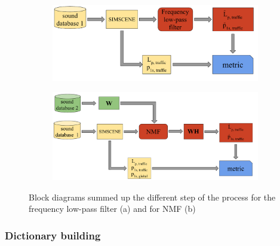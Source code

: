 \documentclass[twocolumn,a4paper,10pt]{article}
\begin{document}
\begin{figure}

    \centering
    \begin{subfigure}[t]{0.45\textwidth}
        \centering
        \includegraphics[width=\linewidth]{figures/bloc_diagram_filtrage_EN.pdf}
  		\caption{}
  		\label{fig:bloc_filtre}
    \end{subfigure}%
    \vfill
    \begin{subfigure}[t]{0.45\textwidth}
        \centering
        \includegraphics[width=\linewidth]{figures/bloc_diagram_NMF_EN.pdf}
		\caption{}
		\label{fig:bloc_nmf}
    \end{subfigure}
    
    \caption{Block diagrams summed up the different step of the process for the frequency low-pass filter (a) and for NMF (b)}
\end{figure}

\subsubsection{Dictionary building}\label{part:dictionary_learning}
\end{document}
